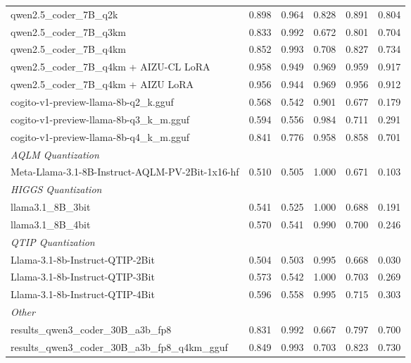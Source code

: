 \begin{table}[htbp]
{\begin{tabular}{lrrrrr}
    qwen2.5\_coder\_7B\_q2k & 0.898 & 0.964 & 0.828 & 0.891 & 0.804 \\
    qwen2.5\_coder\_7B\_q3km & 0.833 & 0.992 & 0.672 & 0.801 & 0.704 \\
    qwen2.5\_coder\_7B\_q4km & 0.852 & 0.993 & 0.708 & 0.827 & 0.734 \\
    qwen2.5\_coder\_7B\_q4km + AIZU-CL LoRA & 0.958 & 0.949 & 0.969 & 0.959 & \cellcolor{green!10}0.917 \\
    qwen2.5\_coder\_7B\_q4km + AIZU LoRA & 0.956 & 0.944 & 0.969 & 0.956 & 0.912 \\
    cogito-v1-preview-llama-8b-q2\_k.gguf & 0.568 & 0.542 & 0.901 & 0.677 & 0.179 \\
    cogito-v1-preview-llama-8b-q3\_k\_m.gguf & 0.594 & 0.556 & 0.984 & 0.711 & 0.291 \\
    cogito-v1-preview-llama-8b-q4\_k\_m.gguf & 0.841 & 0.776 & 0.958 & 0.858 & 0.701 \\
    \midrule
    \multicolumn{6}{l}{\textit{AQLM Quantization}} \\
    \midrule
    Meta-Llama-3.1-8B-Instruct-AQLM-PV-2Bit-1x16-hf & 0.510 & 0.505 & 1.000 & 0.671 & 0.103 \\
    \midrule
    \multicolumn{6}{l}{\textit{HIGGS Quantization}} \\
    \midrule
    llama3.1\_8B\_3bit & 0.541 & 0.525 & 1.000 & 0.688 & 0.191 \\
    llama3.1\_8B\_4bit & 0.570 & 0.541 & 0.990 & 0.700 & 0.246 \\
    \midrule
    \multicolumn{6}{l}{\textit{QTIP Quantization}} \\
    \midrule
    Llama-3.1-8b-Instruct-QTIP-2Bit & 0.504 & 0.503 & 0.995 & 0.668 & 0.030 \\
    Llama-3.1-8b-Instruct-QTIP-3Bit & 0.573 & 0.542 & 1.000 & 0.703 & 0.269 \\
    Llama-3.1-8b-Instruct-QTIP-4Bit & 0.596 & 0.558 & 0.995 & 0.715 & 0.303 \\
    \midrule
    \multicolumn{6}{l}{\textit{Other}} \\
    \midrule
    results\_qwen3\_coder\_30B\_a3b\_fp8 & 0.831 & 0.992 & 0.667 & 0.797 & 0.700 \\
    results\_qwen3\_coder\_30B\_a3b\_fp8\_q4km\_gguf & 0.849 & 0.993 & 0.703 & 0.823 & 0.730 \\
    \bottomrule
  \end{tabular}
  }
\end{table}

